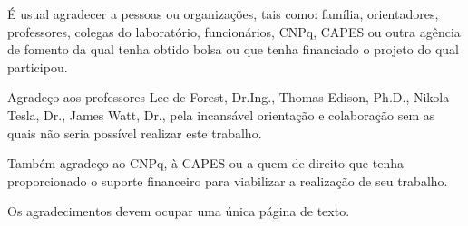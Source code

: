 \noindent 
É usual agradecer a pessoas ou organizações, tais como: família, orientadores, professores, colegas do laboratório, funcionários, CNPq, CAPES ou outra agência de fomento da qual tenha obtido bolsa ou que tenha financiado o projeto do qual participou.

\noindent%
Agradeço aos professores Lee de Forest, Dr.Ing., Thomas Edison,
Ph.D., Nikola Tesla, Dr., James Watt, Dr., pela incansável orientação e colaboração sem as quais não seria possível realizar este trabalho.

\noindent%
Também agradeço ao CNPq, à CAPES ou a quem de direito que tenha proporcionado o suporte financeiro para viabilizar a realização de seu trabalho.

\noindent%
Os agradecimentos devem ocupar uma única página de texto.
\vfill